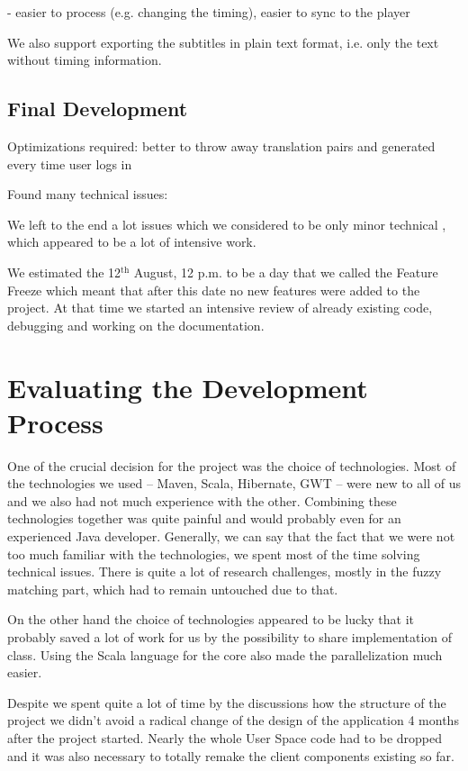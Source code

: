 - easier to process (e.g. changing the timing), easier to sync to the player

We also support exporting the subtitles in plain text format, i.e. only the text without timing information.

\subsection{Final Development}
\label{subsec:final_development}

Optimizations required: better to throw away translation pairs and generated every time user logs in

Found many technical issues: %


We left to the end a lot issues which we considered to be only minor technical , which appeared to be a lot of intensive work.

We estimated the 12$^\mathrm{th}$ August, 12 p.m. to be a day that we called the Feature Freeze which meant that after this date no new features were added to the project. At that time we started an intensive review of already existing code, debugging and working on the documentation. 

\section{Evaluating the Development Process}

One of the crucial decision for the project was the choice of technologies. Most of the technologies we used -- Maven, Scala, Hibernate, GWT -- were new to all of us and we also had not much experience with the other. Combining these technologies together was quite painful and would probably even for an experienced Java developer. Generally, we can say that the fact that we were not too much familiar with the technologies, we spent most of the time solving technical issues. There is quite a lot of research challenges, mostly in the fuzzy matching part, which had to remain untouched due to that.

On the other hand the choice of technologies appeared to be lucky that it probably saved a lot of work for us by the possibility to share implementation of class. Using the Scala language for the core also made the parallelization much easier.

Despite we spent quite a lot of time by the discussions how the structure of the project we didn't avoid a radical change of the design of the application 4 months after the project started. Nearly the whole User Space code had to be dropped and it was also necessary to totally remake the client components existing so far.

